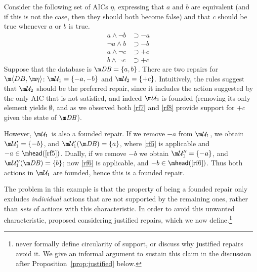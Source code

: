 \begin{example}
  \label{ex:founded}
  Consider the following set of AICs $\eta$, expressing that $a$ and $b$ are equivalent (and if this is not the case, then they should both become false) and that $c$ should be true whenever $a$ or $b$ is true.
  \begin{align}
    a\land\neg b &\supset{-a} \label{rf5} \\
    \neg a\land b &\supset{-b} \label{rf6} \\
    a\land\neg c &\supset{+c} \label{rf7} \\
    b\land\neg c &\supset{+c} \label{rf8} 
  \end{align}
  Suppose that the database is $\db=\{a,b\}$.
  There are two repairs for $\fulldb$: $\UU_1=\{{-a},{-b}\}$ and $\UU_2=\{{+c}\}$.
  Intuitively, the rules suggest that $\UU_2$ should be the preferred repair, since it includes the action suggested by the only AIC that is not satisfied, and indeed $\UU_2$ is founded (removing its only element yields $\emptyset$, and as we observed both \ref{rf7} and \ref{rf8} provide support for ${+c}$ given the state of $\db$).

  However, $\UU_1$ is also a founded repair.
  If we remove ${-a}$ from $\UU_1$, we obtain $\UU_1'=\{{-b}\}$, and $\UU_1'(\db)=\{a\}$, where \ref{rf5} is applicable and ${-a}\in\head(\ref{rf5})$.
  Dually, if we remove ${-b}$ we obtain $\UU_1''=\{{-a}\}$, and $\UU_1''(\db)=\{b\}$; now \ref{rf6} is applicable, and ${-b}\in\head(\ref{rf6})$.
  Thus both actions in $\UU_1$ are founded, hence this is a founded repair.
\end{example}

The problem in this example is that the property of being a founded repair only excludes \emph{individual} actions that are not supported by the remaining ones, rather than \emph{sets} of actions with this characteristic.
In order to avoid this unwanted characteristic, \citet{tplp/CaropreseT11} proposed considering justified repairs, which we now define.\footnote{\citet{tplp/CaropreseT11} never formally define circularity of support, or discuss why justified repairs avoid it. We give an informal argument to sustain this claim in the discussion after Proposition~\ref{prop:justified} below.}

